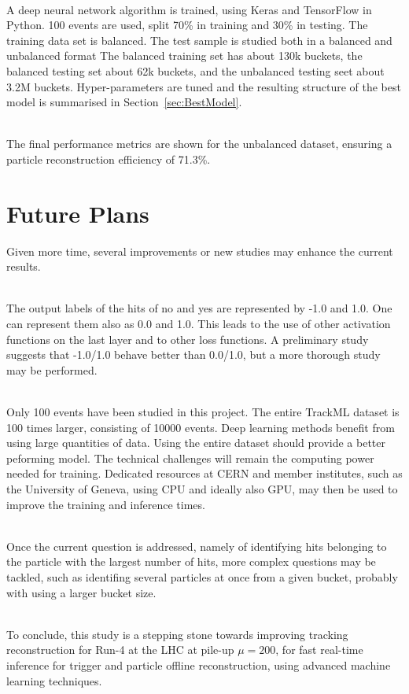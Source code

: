 \ \\A deep neural network algorithm is trained, using Keras and TensorFlow in Python. 100 events are used, split 70\% in training and 30\% in testing. The training data set is balanced. The test sample is studied both in a balanced and unbalanced format The balanced training set has about 130k buckets, the balanced testing set about 62k buckets, and the unbalanced testing seet about 3.2M buckets. Hyper-parameters are tuned and the resulting structure of the best model is summarised in Section~\ref{sec:BestModel}.

\ \\The final performance metrics are shown for the unbalanced dataset, ensuring a particle reconstruction efficiency of 71.3\%. 

\section{Future Plans}

Given more time, several improvements or new studies may enhance the current results.

\ \\The output labels of the hits of no and yes are represented by -1.0 and 1.0. One can represent them also as 0.0 and 1.0. This leads to the use of other activation functions on the last layer and to other loss functions. A preliminary study suggests that -1.0/1.0 behave better than 0.0/1.0, but a more thorough study may be performed. 

\ \\Only 100 events have been studied in this project. The entire TrackML dataset is 100 times larger, consisting of 10000 events. Deep learning methods benefit from using large quantities of data. Using the entire dataset should provide a better peforming model. The technical challenges will remain the computing power needed for training. Dedicated resources at CERN and member institutes, such as the University of Geneva, using CPU and ideally also GPU, may then be used to improve the training and inference times.

\ \\Once the current question is addressed, namely of identifying hits belonging to the particle with the largest number of hits, more complex questions may be tackled, such as identifing several particles at once from a given bucket, probably with using a larger bucket size.

\ \\To conclude, this study is a stepping stone towards improving tracking reconstruction for Run-4 at the LHC at pile-up $\mu=200$, for fast real-time inference for trigger and particle offline reconstruction, using advanced machine learning techniques.
